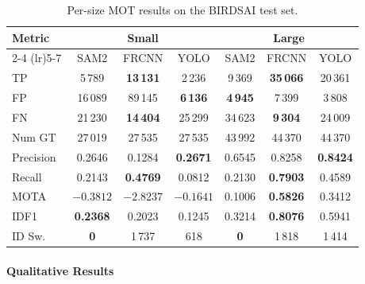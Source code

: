 \documentclass[11pt]{article}
\begin{document}
\begin{table}[htbp]
\centering
\begin{tabular}{l ccc ccc}
\toprule
\textbf{Metric} & \multicolumn{3}{c}{\textbf{Small}} & \multicolumn{3}{c}{\textbf{Large}} \\
\cmidrule(lr){2-4} \cmidrule(lr){5-7}
 & SAM2 & FRCNN & YOLO & SAM2 & FRCNN & YOLO \\
\midrule
TP        & 5\,789           & \textbf{13\,131} & 2\,236           & 9\,369           & \textbf{35\,066} & 20\,361 \\
FP        & 16\,089          & 89\,145          & \textbf{6\,136}  & \textbf{4\,945}  & 7\,399           & 3\,808  \\
FN        & 21\,230          & \textbf{14\,404} & 25\,299          & 34\,623          & \textbf{9\,304}  & 24\,009 \\
Num GT    & 27\,019          & 27\,535          & 27\,535          & 43\,992          & 44\,370          & 44\,370 \\
Precision & 0.2646           & 0.1284           & \textbf{0.2671}  & 0.6545           & 0.8258           & \textbf{0.8424} \\
Recall    & 0.2143           & \textbf{0.4769}  & 0.0812           & 0.2130           & \textbf{0.7903}  & 0.4589  \\
MOTA      & $-0.3812$        & $-2.8237$        & \textbf{$-0.1641$} & 0.1006         & \textbf{0.5826}  & 0.3412  \\
IDF1      & \textbf{0.2368}  & 0.2023           & 0.1245           & 0.3214           & \textbf{0.8076}  & 0.5941  \\
ID Sw.    & \textbf{0}       & 1\,737           & 618              & \textbf{0}       & 1\,818           & 1\,414  \\
\bottomrule
\end{tabular}
\caption{Per-size MOT results on the BIRDSAI test set.}
\label{tab:mot-per-size}
\end{table}


\paragraph{Qualitative Results}\label{MOT_Qualitative}
\end{document}
